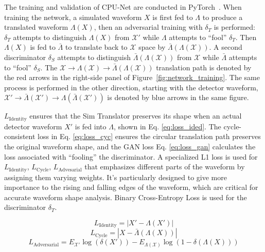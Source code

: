 


The training and validation of CPU-Net are conducted in PyTorch~\cite{pytorch}. When training the network, a simulated waveform $X$ is first fed to $\Lambda$ to produce a translated waveform $\Lambda(X)$, then an adversarial training with $\delta_{T}$ is performed: $\delta_{T}$ attempts to distinguish $\Lambda(X)$ from $\mathcal{X}'$ while $\Lambda$ attempts to ``fool'' $\delta_{T}$. Then $\Lambda(X)$ is fed to $\bar{\Lambda}$ to translate back to $\mathcal{X}$ space by $\bar{\Lambda}(\Lambda(\mathcal{X}))$. A second discriminator $\delta_{S}$ attempts to distinguish $\bar{\Lambda}(\Lambda(\mathcal{X}))$ from $\mathcal{X}$ while $\bar{\Lambda}$ attempts to ``fool'' $\delta_{S}$. The $\mathcal{X}\rightarrow{}\Lambda(\mathcal{X})\rightarrow{}\bar{\Lambda}(\Lambda(\mathcal{X}))$ translation path is denoted by the red arrows in the right-side panel of Figure~\ref{fig:network_training}. The same process is performed in the other direction, starting with the detector waveform, $\mathcal{X}'\rightarrow{}\bar{\Lambda}(\mathcal{X}')\rightarrow{}\Lambda(\bar{\Lambda}(\mathcal{X}'))$ is denoted by blue arrows in the same figure.  

$L_{\mathrm{Identity}}$ ensures that the Sim Translator preserves its shape when an actual detector waveform $X'$ is fed into $\Lambda$, shown in Eq. \ref{eq:loss_ided}. The cycle-consistent loss in Eq. \ref{eq:loss_cyc} ensures the circular translation path preserves the original waveform shape, and the GAN loss Eq. \ref{eq:loss_gan} calculates the loss associated with ``fooling'' the discriminator. A specialized L1 loss is used for $L_{\mathrm{Identity}}$, $L_{\mathrm{Cycle}}$, $L_{\mathrm{Advesarial}}$ that emphasizes different parts of the waveform by assigning them varying weights. It's particularly designed to give more importance to the rising and falling edges of the waveform, which are critical for accurate waveform shape analysis. Binary Cross-Entropy Loss is used for the discriminator $\delta_{T}$.

\begin{equation}\label{eq:loss_ided}
    L_{\mathrm{Identity}} = |X' - \Lambda(X')|
\end{equation}
\begin{equation}\label{eq:loss_cyc}
    L_{\mathrm{Cycle}} = |X - \bar{\Lambda}(\Lambda(X))|
\end{equation}
\begin{equation}\label{eq:loss_gan}
    L_{\mathrm{Adversarial}} = E_{\mathcal{X'}}\log(\delta(X')) - E_{\Lambda(\mathcal{X})}\log(1 - \delta(\Lambda(X)))
\end{equation}

